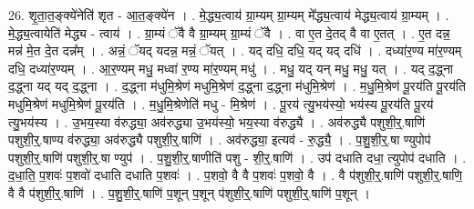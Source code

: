 \documentclass[17pt]{extarticle}
\begin{document}
26. शृ॒ता॒त॒ङ्क्ये॑नेति॑ शृत - आ॒त॒ङ्क्ये॑न । . मे॒द्ध्य॒त्वाय॑ ग्रा॒म्यम् ग्रा॒म्यम् मे᳚द्ध्य॒त्वाय॑ मेद्ध्य॒त्वाय॑ ग्रा॒म्यम् । . मे॒द्ध्य॒त्वायेति॑ मेद्ध्य - त्वाय॑ । . ग्रा॒म्यं ॅवै वै ग्रा॒म्यम् ग्रा॒म्यं ॅवै । . वा ए॒त दे॒तद् वै वा ए॒तत् । . ए॒त दन्न॒ मन्न॑ मे॒त दे॒त दन्न᳚म् । . अन्नं॒ ॅयद् यदन्न॒ मन्नं॒ ॅयत् । . यद् दधि॒ दधि॒ यद् यद् दधि॑ । . दध्या॑र॒ण्य मा॑र॒ण्यम् दधि॒ दध्या॑र॒ण्यम् । . आ॒र॒ण्यम् मधु॒ मध्वा॑ र॒ण्य मा॑र॒ण्यम् मधु॑ । . मधु॒ यद् यन् मधु॒ मधु॒ यत् । . यद् द॒द्ध्ना द॒द्ध्ना यद् यद् द॒द्ध्ना । . द॒द्ध्ना म॑धुमि॒श्रेण॑ मधुमि॒श्रेण॑ द॒द्ध्ना द॒द्ध्ना म॑धुमि॒श्रेण॑ । . म॒धु॒मि॒श्रेण॑ पू॒रय॑ति पू॒रय॑ति मधुमि॒श्रेण॑ मधुमि॒श्रेण॑ पू॒रय॑ति । . म॒धु॒मि॒श्रेणेति॑ मधु - मि॒श्रेण॑ । . पू॒रय॑ त्यु॒भय॑स्यो॒ भय॑स्य पू॒रय॑ति पू॒रय॑ त्यु॒भय॑स्य । . उ॒भय॒स्या व॑रुद्ध्या॒ अव॑रुद्ध्या उ॒भय॑स्यो॒ भय॒स्या व॑रुद्ध्यै । . अव॑रुद्ध्यै पशुशी॒र्॒.षाणि॑ पशुशी॒र्॒.षाण्य व॑रुद्ध्या॒ अव॑रुद्ध्यै पशुशी॒र्॒.षाणि॑ । . अव॑रुद्ध्या॒ इत्यव॑ - रु॒द्ध्यै॒ । . प॒शु॒शी॒र्॒.षा ण्युपोप॑ पशुशी॒र्॒.षाणि॑ पशुशी॒र्॒.षा ण्युप॑ । . प॒शु॒शी॒र्॒.षाणीति॑ पशु - शी॒र्॒.षाणि॑ । . उप॑ दधाति दधा॒ त्युपोप॑ दधाति । . द॒धा॒ति॒ प॒शवः॑ प॒शवो॑ दधाति दधाति प॒शवः॑ । . प॒शवो॒ वै वै प॒शवः॑ प॒शवो॒ वै । . वै प॑शुशी॒र्॒.षाणि॑ पशुशी॒र्॒.षाणि॒ वै वै प॑शुशी॒र्॒.षाणि॑ । . प॒शु॒शी॒र्॒.षाणि॑ प॒शून् प॒शून् प॑शुशी॒र्॒.षाणि॑ पशुशी॒र्॒.षाणि॑ प॒शून् । \newline
\end{document}

